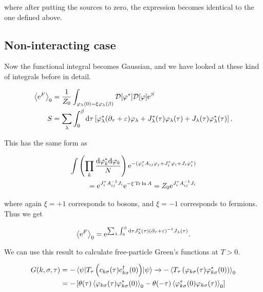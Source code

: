where after putting the sources to zero, the expression becomes identical to the one defined above.

\subsection{Non-interacting case}

Now the functional integral becomes Gaussian, and we have looked at these kind of integrals before in detail. 

\begin{align*}
    \expval{\mathrm{e}^F}_0 &= \frac{1}{Z_0}\int_{\varphi_\lambda(0) = \xi \varphi_\lambda(\beta)} \mathcal{D} [\varphi^*] \mathcal{D}[\varphi]\mathrm{e}^{S} \\ 
    S &= \sum_\lambda \int_{0}^{\beta} \dd \tau \left[ \varphi_\lambda ^* ( \partial_\tau + \varepsilon) \varphi_\lambda + J_\lambda ^*(\tau)\varphi_\lambda(\tau) + J_\lambda (\tau)\varphi_\lambda ^*(\tau) \right].
\end{align*}

This has the same form as 

\begin{align*}
    \int \left(\prod_k \frac{\dd \varphi_k^* \dd \varphi_k}{N} \right) \mathrm{e}^{-\left( \varphi_i^*A_{ij}\varphi_j + J_i ^* \varphi_i + J_i \varphi_i ^* \right)} \\  
    = \mathrm{e}^{J_i ^* A_{ij}^{-1} J_i} \mathrm{e}^{-\xi \Tr \ln{A}} = Z_0 \mathrm{e}^{J_i ^* A_{ij}^{-1} J_i}
\end{align*}

where again $\xi = +1$ corresponds to bosons, and $\xi = -1$ corresponds to fermions. Thus we get 

\begin{equation*}
    \expval{\mathrm{e}^F}_0  = \mathrm{e}^{\sum_\lambda \int_{0}^{\beta} \dd \tau J_\lambda ^*(\tau) (\partial_\tau + \varepsilon)^{-1}J_\lambda(\tau)}. 
\end{equation*}

We can use this result to calculate free-particle Green's functions at $T > 0$. 

\begin{align*}
    G(k, \sigma, \tau) &= -\ev{T_\tau \left( c_{k\sigma}(\tau)c^{\dagger}_{k\sigma}(0)\right)}{\psi} \xrightarrow{} - \expval{T_\tau \left(\varphi_{k\sigma}(\tau) \varphi^{*}_{k\sigma}(0)\right)}_0 \\ 
    &= -\left[ \theta(\tau) \expval{\varphi_{k\sigma}(\tau) \varphi^{*}_{k\sigma}(0)}_0  - \theta(-\tau)\expval{\varphi^{*}_{k\sigma}(0) \varphi_{k\sigma}(\tau)}_0\right]
\end{align*}

